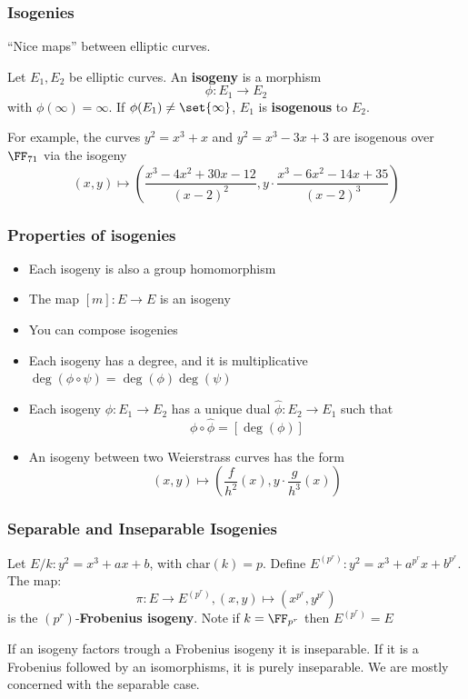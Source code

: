 \documentclass{beamer}
\begin{document}
\begin{frame}
    \frametitle{Isogenies}
    ``Nice maps'' between elliptic curves.
    \pause
    \begin{definition}
        Let $E_1, E_2$ be elliptic curves. An \textbf{isogeny} is a morphism
        \[ \phi : E_1 \to E_2 \]
        with $\phi(\infty) = \infty$.
        If $\phi(E_1) \neq \set{\infty}$, $E_1$ is \textbf{isogenous} to $E_2$.
    \end{definition}
    \pause
    For example, the curves $y^2 = x^3 + x$ and $y^2 = x^3 - 3x + 3$ are isogenous over $\FF_{71}$ via the isogeny 
    \[ (x, y) \mapsto \left(\frac{x^3 - 4 x^2 + 30 x -12}{(x - 2)^2}, y\cdot\frac{x^3 - 6x^2 -14x + 35}{(x - 2)^3} \right)\]
\end{frame}

\begin{frame}
    \frametitle{Properties of isogenies}

    \begin{itemize}
        \item<1-> Each isogeny is also a group homomorphism
        \item<2-> The map $[m]: E \to E$ is an isogeny
        \item<3-> You can compose isogenies
        \item<4-> Each isogeny has a degree, and it is multiplicative $\deg(\phi \circ \psi) = \deg(\phi)\deg(\psi)$
        \item<5-> Each isogeny $\phi: E_1 \to E_2$ has a unique dual $\hat{\phi}: E_2 \to E_1$ such that 
        \[ \phi \circ \hat{\phi} = [\deg(\phi)] \]
        \item<6-> An isogeny between two Weierstrass curves has the form
        \[ (x, y) \mapsto \left(\frac{f}{h^2}(x), y\cdot \frac{g}{h^3}(x) \right) \]
    \end{itemize}
\end{frame}

\begin{frame}
    \frametitle{Separable and Inseparable Isogenies}
    \begin{definition}
        Let $E/k: y^2 = x^3 + ax + b$, with $\mathrm{char}(k) = p$. Define $E^{(p^r)}: y^2 = x^3 + a^{p^r} x + b^{p^r}$.
        The map:
        \[ \pi: E \to E^{(p^r)}, (x, y) \mapsto \left(x^{p^r}, y^{p^r} \right) \]
        is the $(p^r)$-\textbf{Frobenius isogeny}. 
        \pause 
        Note if $k = \FF_{p^r}$ then $E^{(p^r)} = E$
    \end{definition}
    \pause
    If an isogeny factors trough a Frobenius isogeny it is inseparable. 
    If it is a Frobenius followed by an isomorphisms, it is purely inseparable.
    \pause
    We are mostly  concerned with the separable case.

\end{frame}
\end{document}
